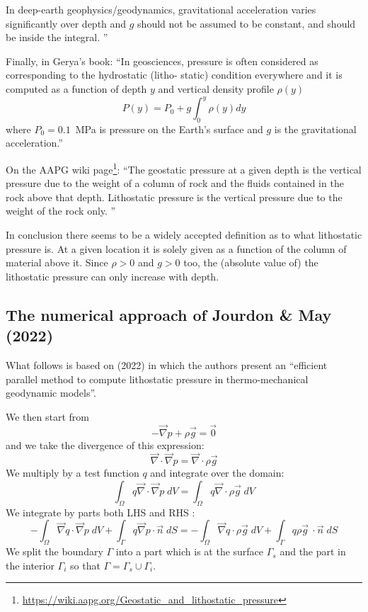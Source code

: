 In deep-earth geophysics/geodynamics, gravitational acceleration varies significantly over depth and $g$
should not be assumed to be constant, and should be inside the integral. ''

Finally, in Gerya's book:
``In geosciences, pressure is often considered as corresponding to the hydrostatic (litho-
static) condition everywhere and it is computed as a function of depth $y$ and vertical density
profile $\rho(y)$
\[
P(y)=P_0 + g \int_0^y \rho(y) dy
\]
where $P_0=0.1$~MPa is pressure on the Earth’s surface and $g$ is the gravitational
acceleration.''

On the AAPG wiki page\footnote{\url{https://wiki.aapg.org/Geostatic_and_lithostatic_pressure}}:
``The geostatic pressure at a given depth is the vertical pressure due to the weight of a column of 
rock and the fluids contained in the rock above that depth. Lithostatic pressure is the vertical 
pressure due to the weight of the rock only. ''

In conclusion there seems to be a widely accepted definition as to what lithostatic pressure is.
At a given location it is solely given as a function of the column of material 
above it. Since $\rho>0$ and $g>0$ too, the (absolute value of) the lithostatic pressure
can only increase with depth.

\subsection*{The numerical approach of Jourdon \& May (2022)}

What follows is based on \textcite{joma22} (2022) in which the authors present an
``efficient parallel method to compute lithostatic pressure in thermo-mechanical geodynamic models''.

We then start from 
\begin{equation}
-\vec\nabla p + \rho \vec{g} = \vec{0}
\label{eq:gradpstrong}
\end{equation}
and we take the divergence of this expression:
\[
\vec\nabla \cdot \vec\nabla p = \vec\nabla \cdot \rho \vec{g} 
\]
We multiply by a test function $q$ and integrate over the domain:
\[
\int_\Omega q \vec\nabla \cdot \vec\nabla p \;dV
=
\int_\Omega q \vec\nabla \cdot \rho \vec{g} \;dV
\]
We integrate by parts both LHS and RHS :
\[
-\int_\Omega \vec\nabla q \cdot  \vec\nabla p \;dV + \int_\Gamma q \vec\nabla p \cdot \vec{n} \;dS
=
-\int_\Omega  \vec\nabla q \cdot  \rho \vec{g} \;dV + \int_\Gamma q \rho \vec{g} \    \cdot \vec{n} \;dS
\]
We split the boundary $\Gamma$ into a part which is at the surface $\Gamma_s$ and the part 
in the interior $\Gamma_i$ so that $\Gamma = \Gamma_s \cup \Gamma_i$.
    

